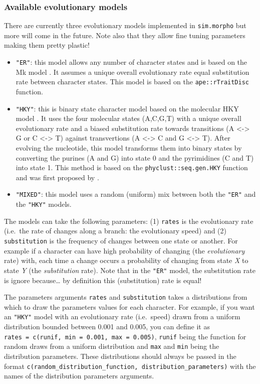 \documentclass[]{book}
\providecommand{\tightlist}{%
  \setlength{\itemsep}{0pt}\setlength{\parskip}{0pt}}
\theoremstyle{definition}
\theoremstyle{definition}
\theoremstyle{remark}
\begin{document}
\subsubsection{Available evolutionary
models}\label{available-evolutionary-models}

There are currently three evolutionary models implemented in
\texttt{sim.morpho} but more will come in the future. Note also that
they allow fine tuning parameters making them pretty plastic!

\begin{itemize}
\tightlist
\item
  \texttt{"ER"}: this model allows any number of character states and is
  based on the Mk model \citep{lewisa2001}. It assumes a unique overall
  evolutionary rate equal substitution rate between character states.
  This model is based on the \texttt{ape::rTraitDisc} function.
\item
  \texttt{"HKY"}: this is binary state character model based on the
  molecular HKY model \citep{HKY85}. It uses the four molecular states
  (A,C,G,T) with a unique overall evolutionary rate and a biased
  substitution rate towards transitions (A \textless{}-\textgreater{} G
  or C \textless{}-\textgreater{} T) against transvertions (A
  \textless{}-\textgreater{} C and G \textless{}-\textgreater{} T).
  After evolving the nucleotide, this model transforms them into binary
  states by converting the purines (A and G) into state 0 and the
  pyrimidines (C and T) into state 1. This method is based on the
  \texttt{phyclust::seq.gen.HKY} function and was first proposed by
  \citet{OReilly2016}.
\item
  \texttt{"MIXED"}: this model uses a random (uniform) mix between both
  the \texttt{"ER"} and the \texttt{"HKY"} models.
\end{itemize}

The models can take the following parameters: (1) \texttt{rates} is the
evolutionary rate (i.e.~the rate of changes along a branch: the
evolutionary speed) and (2) \texttt{substitution} is the frequency of
changes between one state or another. For example if a character can
have high probability of changing (the \emph{evolutionary} rate) with,
each time a change occurs a probability of changing from state \emph{X}
to state \emph{Y} (the \emph{substitution} rate). Note that in the
\texttt{"ER"} model, the substitution rate is ignore because\ldots{} by
definition this (substitution) rate is equal!

The parameters arguments \texttt{rates} and \texttt{substitution} takes
a distributions from which to draw the parameters values for each
character. For example, if you want an \texttt{"HKY"} model with an
evolutionary rate (i.e.~speed) drawn from a uniform distribution bounded
between 0.001 and 0.005, you can define it as
\texttt{rates\ =\ c(runif,\ min\ =\ 0.001,\ max\ =\ 0.005)},
\texttt{runif} being the function for random draws from a uniform
distribution and \texttt{max} and \texttt{min} being the distribution
parameters. These distributions should always be passed in the format
\texttt{c(random\_distribution\_function,\ distribution\_parameters)}
with the names of the distribution parameters arguments.
\end{document}
